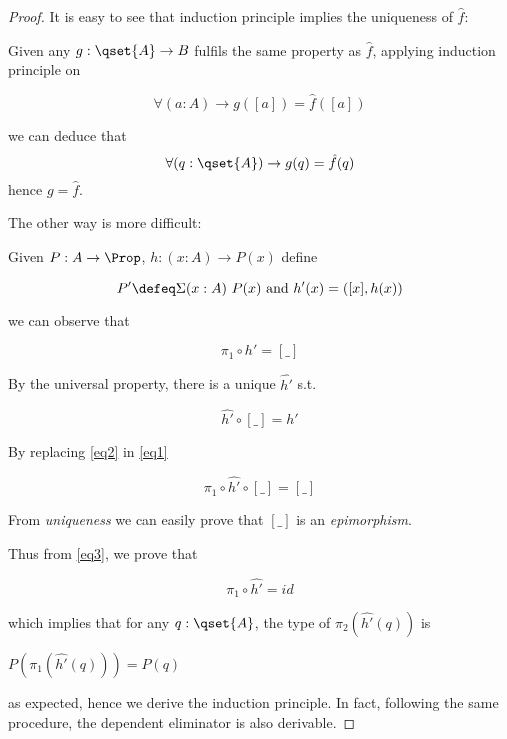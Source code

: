 \begin{proof}
It is easy to see that induction principle implies the uniqueness of $\hat{f}$:

Given any $g : \qset{A} \to B$ fulfils the same property as $\hat{f}$, applying induction principle on 

$$\forall (a :A) \to g([a]) = \hat{f}([a])$$

we can deduce that $$\forall (q : \qset{A}) \to g(q) = \hat{f}(q)$$ hence $g = \hat{f}$.

The other way is more difficult:

Given $P : A \to \Prop$, $h : (x : A) \to P (x)$ define

$$P' \defeq \Sigma(x : A) ~P(x) ~\text{and}~ h'(x) = ([x],h(x))$$

we can observe that 

\begin{equation}\label{eq1}
\pi_1 \circ h' = [\_]
\end{equation}

By the universal property, there is a unique $\hat{h'}$ s.t. 

\begin{equation}\label{eq2}
\hat{h'} \circ [\_] = h'
\end{equation}

By replacing \ref{eq2} in \ref{eq1}

\begin{equation}\label{eq3}
\pi_1 \circ \hat{h'} \circ [\_] = [\_]
\end{equation}

From \emph{uniqueness} we can easily prove that $[\_]$ is an \emph{epimorphism}.






Thus from \ref{eq3}, we prove that

$$\pi_1 \circ \hat{h'} = id$$

which implies that for any $q : \qset{A}$, the type of $\pi_2(\hat{h'}(q))$ is

$P(\pi_1(\hat{h'}(q))) = P(q)$

as expected, hence we derive the induction principle. 
In fact, following the same procedure, the dependent eliminator is also derivable.
\end{proof}


